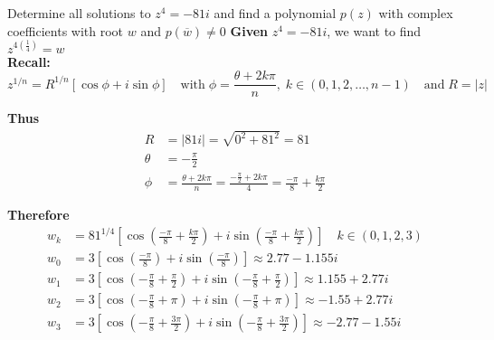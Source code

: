 \documentclass[a4paper, 8pt]{extarticle}
\begin{document}
\begin{examplebox}{Determine all solutions to $z^4 = -81i$ and find a polynomial $p(z)$ with complex coefficients with root $w$ and $p(\overline{w}) \neq 0$}{}
	\label{sol:20188Q1b}
	\textbf{Given} $z^4 = -81i$, we want to find $z^{4\left(\frac{1}{4}\right)} = w $ \\
	\textbf{Recall:}
	$$z^{1/n} = R^{1/n}[\cos\phi + i\sin \phi] \quad \text{with} \; \phi = \frac{\theta + 2k\pi}{n}, \; k \in (0,1,2,\dots, n-1) \quad \text{and} \; R = |z|$$
	\begin{minipage}{0.49\textwidth}
		\textbf{Thus}
		\begin{align*}
			R      & = |81i| = \sqrt{0^2 + 81^2} = 81                                                                \\
			\theta & = -\frac{\pi}{2}                                                                                \\
			\phi   & = \frac{\theta + 2k\pi}{n} = \frac{-\frac{\pi}{2} + 2k\pi}{4} = \frac{-\pi}{8} + \frac{k\pi}{2}
		\end{align*}
	\end{minipage}
	\begin{minipage}{0.5\textwidth}
		\begin{center}
		\end{center}
	\end{minipage}

	\textbf{Therefore}
	\begin{align*}
		w_k & = 81^{1/4}\left[\cos\left(\frac{-\pi}{8} + \frac{k\pi}{2}\right) + i\sin\left(\frac{-\pi}{8} + \frac{k\pi}{2}\right)\right] \quad k \in (0,1,2,3) \\
		w_0 & = 3\left[\cos\left(\frac{-\pi}{8}\right) + i\sin\left(\frac{-\pi}{8}\right)\right] \approx 2.77 - 1.155i                                          \\
		w_1 & = 3\left[\cos\left(-\frac{\pi}{8} + \frac{\pi}{2}\right) + i\sin\left(-\frac{\pi}{8} + \frac{\pi}{2}\right)\right] \approx 1.155 + 2.77i          \\
		w_2 & = 3\left[\cos\left(-\frac{\pi}{8} + \pi\right) + i\sin\left(-\frac{\pi}{8} + \pi\right)\right] \approx -1.55 + 2.77i                              \\
		w_3 & = 3\left[\cos\left(-\frac{\pi}{8} + \frac{3\pi}{2}\right) + i\sin\left(-\frac{\pi}{8} + \frac{3\pi}{2}\right)\right] \approx -2.77 - 1.55i
	\end{align*}



\end{examplebox}
\end{document}
